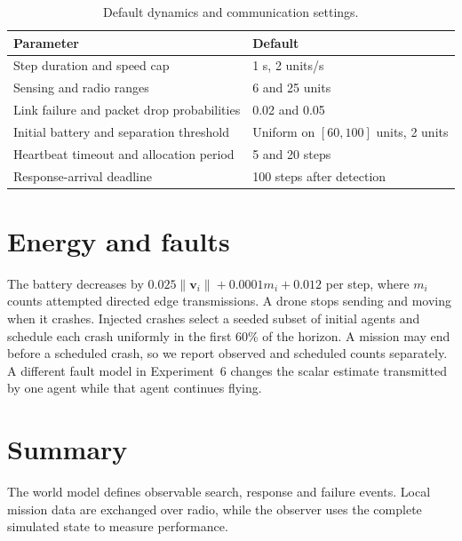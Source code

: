 \begin{table}[!htbp]
\centering
\caption{Default dynamics and communication settings.}
\begin{tabularx}{\linewidth}{@{}Y l@{}}
\toprule
Parameter & Default \\
\midrule
Step duration and speed cap & 1 s, 2 units/s\\
Sensing and radio ranges & 6 and 25 units\\
Link failure and packet drop probabilities & 0.02 and 0.05\\
Initial battery and separation threshold & Uniform on $[60,100]$ units, 2 units\\
Heartbeat timeout and allocation period & 5 and 20 steps\\
Response-arrival deadline & 100 steps after detection\\
\bottomrule
\end{tabularx}
\end{table}

\section{Energy and faults}
The battery decreases by $0.025\|\boldsymbol v_i\|+0.0001m_i+0.012$ per step, where $m_i$ counts attempted directed edge transmissions. A drone stops sending and moving when it crashes. Injected crashes select a seeded subset of initial agents and schedule each crash uniformly in the first 60\% of the horizon. A mission may end before a scheduled crash, so we report observed and scheduled counts separately. A different fault model in Experiment~6 changes the scalar estimate transmitted by one agent while that agent continues flying.

\section{Summary}
The world model defines observable search, response and failure events. Local mission data are exchanged over radio, while the observer uses the complete simulated state to measure performance.
